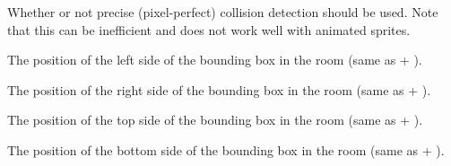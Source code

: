 \documentclass[letterpaper,10pt,english]{sphinxmanual}
\begin{document}
\begin{fulllineitems}
\begin{fulllineitems}
\label{dsp:sge.dsp.Object.collision_precise}
Whether or not precise (pixel-perfect) collision detection should
be used.  Note that this can be inefficient and does not work
well with animated sprites.

\end{fulllineitems}


\begin{fulllineitems}
\label{dsp:sge.dsp.Object.bbox_left}
The position of the left side of the bounding box in the room
(same as {\hyperref[dsp:sge.dsp.Object.x]{\emph{}}} + {\hyperref[dsp:sge.dsp.Object.bbox_x]{\emph{}}}).

\end{fulllineitems}


\begin{fulllineitems}
\label{dsp:sge.dsp.Object.bbox_right}
The position of the right side of the bounding box in the room
(same as {\hyperref[dsp:sge.dsp.Object.bbox_left]{\emph{}}} + {\hyperref[dsp:sge.dsp.Object.bbox_width]{\emph{}}}).

\end{fulllineitems}


\begin{fulllineitems}
\label{dsp:sge.dsp.Object.bbox_top}
The position of the top side of the bounding box in the room
(same as {\hyperref[dsp:sge.dsp.Object.y]{\emph{}}} + {\hyperref[dsp:sge.dsp.Object.bbox_y]{\emph{}}}).

\end{fulllineitems}


\begin{fulllineitems}
\label{dsp:sge.dsp.Object.bbox_bottom}
The position of the bottom side of the bounding box in the room
(same as {\hyperref[dsp:sge.dsp.Object.bbox_top]{\emph{}}} + {\hyperref[dsp:sge.dsp.Object.bbox_height]{\emph{}}}).


\end{fulllineitems}
\end{fulllineitems}
\end{document}
